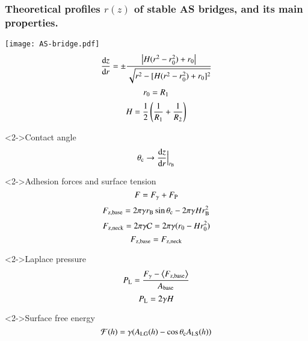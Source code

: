 \documentclass[8pt]{beamer}
\begin{document}
\begin{frame}
\frametitle{Theoretical profiles $r(z)$ of stable AS bridges, and its main properties. }
    \vspace{-0.2cm}

		\begin{minipage}{0.45\textwidth}   
				\begin{center}
				 	\texttt{[image: AS-bridge.pdf]}\\
			 		$$\frac{{\rm d}z}{{\rm d}r} = \pm \frac{\left | H(r^{\rm 2} - r_{\rm 0}^{\rm 2}) + r_{\rm 0} \right |}{\sqrt{r^{\rm 2} -[H(r^{\rm 2} - r_{\rm 0}^{\rm 2}) + r_{\rm 0}]^{\rm 2}}}$$					 	
			 		$$r_{\rm 0} = R_{\rm 1} $$ 
			 		$$H = \frac{1}{2}  \left( \frac{1}{R_{\rm 1}} + \frac{1}{R_{\rm 2}} \right)  $$
				\end{center}
		\end{minipage}
		\begin{minipage}{0.5\textwidth}
  	   		\begin{block}{Contact angle}
                   $$\theta_{\rm c}\rightarrow \frac{{\rm d}z}{{\rm d}r} \Big|_{r_{\rm B}}$$
	  	   	\end{block}	
		    \vspace{-0.3cm}	  	   	
	  	   	\begin{block}{Adhesion forces and surface tension}
	  	   		   $$F = F_{\rm \gamma} +  F_{\rm P}$$
	   	           $$F_{\rm{z,base}}= 2\pi\gamma r_{\rm B}\sin\theta_{\rm c} -2\pi \gamma H r_{\rm B}^{\rm 2}$$
	   	           $$F_{\rm{z,neck}}=2\pi\gamma \mathcal C = 2\pi\gamma(r_{\rm 0} - Hr_{\rm 0}^{\rm 2})$$
                   $$F_{\rm{z,base}}=F_{\rm z,neck}$$					
	  	   	\end{block}	
		    \vspace{-0.3cm}	  	   		  	   	
	  	   	\begin{block}{Laplace pressure}
		           $$P_{\rm L} =  \frac{F_{\rm \gamma} -\left\langle  F_{\rm{z,base}} \right\rangle }{A_{\rm base}}$$ 
		           $$P_{\rm L} =  2\gamma H$$
	  	   	\end{block}		  	   	
		    \vspace{-0.3cm}	  	   		  	   	
	  	   	\begin{block}{Surface free energy}
			       $$\mathcal F(h) = \gamma (A_{\rm LG}(h) - \cos\theta_{\rm c} A_{\rm LS}(h))$$
	  	   	\end{block}		  	   		
		\end{minipage}		
\end{frame}		
\end{document}
